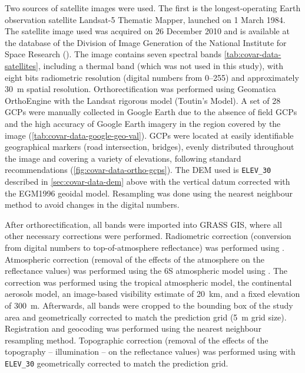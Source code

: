 Two sources of satellite images were used. The first is the longest-operating Earth observation satellite 
Landsat-5 Thematic Mapper, launched on \num{1} March \num{1984}. The satellite image used was acquired on 
\num{26} December \num{2010} and is available at the database of the Division of Image Generation of the 
National Institute for Space Research (\inpedgi). The image contains seven spectral bands 
\autoref{tab:covar-data-satellites}, including a thermal band (which was not used in this study), with eight 
bits radiometric resolution (digital numbers from \numrange{0}{255}) and approximately \SI{30}{\m} spatial 
resolution. Orthorectification was performed using Geomatica\textregistered{} OrthoEngine\textregistered{} with 
the Landsat rigorous model (Toutin's Model). A set of \num{28} GCPs were manually collected in Google 
Earth\textregistered{} due to the absence of field GCPs and the high accuracy of Google Earth\textregistered{} 
imagery in the region covered by the image (\autoref{tab:covar-data-google-geo-val}). GCPs were located at 
easily identifiable geographical markers (road intersection, bridges), evenly distributed throughout the image 
and covering a variety of elevations, following standard recommendations \cite{PCIGeomatics2007} 
(\autoref{fig:covar-data-ortho-gcps}). The DEM used is \texttt{ELEV\_30} described in 
\autoref{sec:covar-data-dem} above with the vertical datum corrected with the EGM1996 geoidal model. Resampling 
was done using the nearest neighbour method to avoid changes in the digital numbers.


After orthorectification, all bands were imported into GRASS GIS, where all other necessary corrections were 
performed. Radiometric correction (conversion from digital numbers to top-of-atmosphere reflectance) was 
performed using . Atmospheric correction (removal of the effects of the atmosphere on 
the reflectance values) was performed using the 6S atmospheric model \cite{VermoteEtAl1997} using 
. The correction was performed using the tropical atmospheric model, the continental aerosols 
model, an image-based visibility estimate of \SI{20}{\km}, and a fixed elevation of \SI{300}{\m}. Afterwards, 
all bands were cropped to the bounding box of the study area and geometrically corrected to match the 
prediction grid (\SI{5}{\m} grid size). Registration and geocoding was performed using the nearest neighbour 
resampling method. Topographic correction (removal of the effects of the topography -- illumination -- on the 
reflectance values) was performed using  with \texttt{ELEV\_30} geometrically corrected to 
match the prediction grid.

